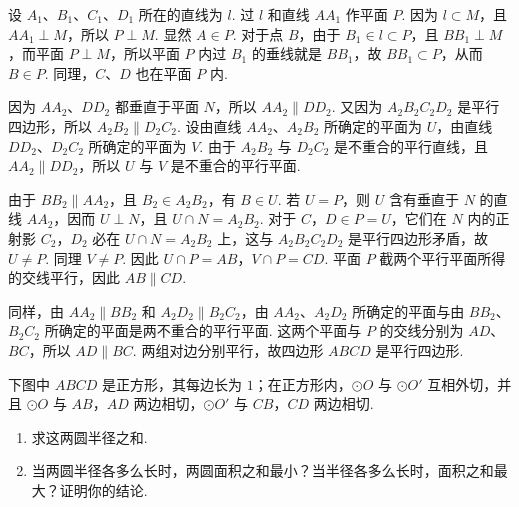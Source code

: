 \documentclass[UTF8,a4paper,oneside,11pt]{ctexbook}
\begin{document}
\begin{solution}
设 \(A_1\)、\(B_1\)、\(C_1\)、\(D_1\) 所在的直线为 \(l\). 过 \(l\) 和直线 \(AA_1\) 作平面 \(P\). 因为 \(l\subset M\)，且 \(AA_1\perp M\)，所以 \(P\perp M\). 显然 \(A\in P\). 对于点 \(B\)，由于 \(B_1\in l\subset P\)，且 \(BB_1\perp M\)，而平面 \(P\perp M\)，所以平面 \(P\) 内过 \(B_1\) 的垂线就是 \(BB_1\)，故 \(BB_1\subset P\)，从而 \(B\in P\). 同理，\(C\)、\(D\) 也在平面 \(P\) 内.


因为 \(AA_2\)、\(DD_2\) 都垂直于平面 \(N\)，所以 \(AA_2\parallel DD_2\). 又因为 \(A_2B_2C_2D_2\) 是平行四边形，所以 \(A_2B_2\parallel D_2C_2\). 设由直线 \(AA_2\)、\(A_2B_2\) 所确定的平面为 \(U\)，由直线 \(DD_2\)、\(D_2C_2\) 所确定的平面为 \(V\). 由于 \(A_2B_2\) 与 \(D_2C_2\) 是不重合的平行直线，且 \(AA_2\parallel DD_2\)，所以 \(U\) 与 \(V\) 是不重合的平行平面.

由于 \(BB_2\parallel AA_2\)，且 \(B_2\in A_2B_2\)，有 \(B\in U\). 若 \(U=P\)，则 \(U\) 含有垂直于 \(N\) 的直线 \(AA_2\)，因而 \(U\perp N\)，且 \(U\cap N=A_2B_2\). 对于 \(C\)，\(D\in P=U\)，它们在 \(N\) 内的正射影 \(C_2\)，\(D_2\) 必在 \(U\cap N=A_2B_2\) 上，这与 \(A_2B_2C_2D_2\) 是平行四边形矛盾，故 \(U\ne P\). 同理 \(V\ne P\). 因此 \(U\cap P=AB\)，\(V\cap P=CD\). 平面 \(P\) 截两个平行平面所得的交线平行，因此 \(AB\parallel CD\).

同样，由 \(AA_2\parallel BB_2\) 和 \(A_2D_2\parallel B_2C_2\)，由 \(AA_2\)、\(A_2D_2\) 所确定的平面与由 \(BB_2\)、\(B_2C_2\) 所确定的平面是两不重合的平行平面. 这两个平面与 \(P\) 的交线分别为 \(AD\)、\(BC\)，所以 \(AD\parallel BC\). 两组对边分别平行，故四边形 \(ABCD\) 是平行四边形.
\end{solution}

\begin{problem}
下图中 \(ABCD\) 是正方形，其每边长为 \(1\)；在正方形内，\(\odot O\) 与 \(\odot O'\) 互相外切，并且 \(\odot O\) 与 \(AB\)，\(AD\) 两边相切，\(\odot O'\) 与 \(CB\)，\(CD\) 两边相切.

\begin{enumerate}
\item 求这两圆半径之和.
\item 当两圆半径各多么长时，两圆面积之和最小？当半径各多么长时，面积之和最大？证明你的结论.
\end{enumerate}

\end{problem}
\end{document}
